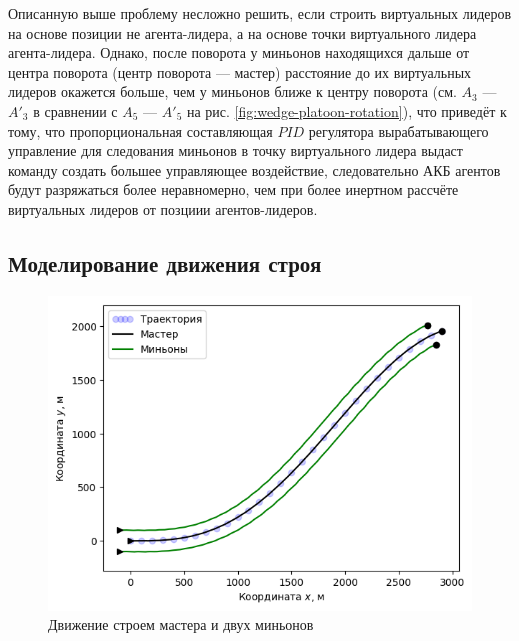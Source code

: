 \documentclass[12pt,a4paper]{article}
\begin{document}
Описанную выше проблему несложно решить, если строить виртуальных лидеров на основе позиции не агента-лидера, а на основе точки виртуального лидера агента-лидера. Однако, после поворота у миньонов находящихся дальше от центра поворота (центр поворота — мастер) расстояние до их виртуальных лидеров окажется больше, чем у миньонов ближе к центру поворота (см. $A_3$ — $A'_3$ в сравнении с $A_5$ — $A'_5$ на рис. \ref{fig:wedge-platoon-rotation}), что приведёт к тому, что пропорциональная составляющая $PID$ регулятора вырабатывающего управление для следования миньонов в точку виртуального лидера выдаст команду создать большее управляющее воздействие, следовательно АКБ агентов будут разряжаться более неравномерно, чем при более инертном рассчёте виртуальных лидеров от позциии агентов-лидеров.
\subsection{Моделирование движения строя}


\begin{figure}[!htbp]
	\centering
	\includegraphics[width=0.7\linewidth]{platoon-trajectory-0}
	\caption{Движение строем мастера и двух миньонов}
	\label{fig:platoon-trajectory-0}
\end{figure}
\end{document}

